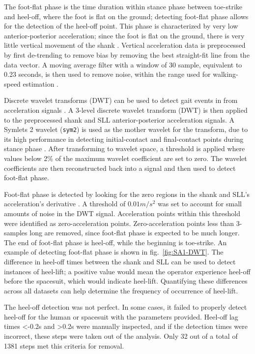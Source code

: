 \documentclass[defaultstyle,11pt]{comps}
\begin{document}
The foot-flat phase is the time duration within stance phase between toe-strike and heel-off, where the foot is flat on the ground; detecting foot-flat phase allows for the detection of the heel-off point.
This phase is characterized by very low anterior-posterior acceleration; since the foot is flat on the ground, there is very little vertical movement of the shank \citep{Rebula2013}.
Vertical acceleration data is preprocessed by first de-trending to remove bias by removing the best straight-fit line from the data vector.
A moving average filter with a window of 30 sample, equivalent to 0.23 seconds, is then used to remove noise, within the range used for walking-speed estimation \citep{Byun2019}.

Discrete wavelet transforms (DWT) can be used to detect gait events in from acceleration signals \citep{Ji2019}.
A 3-level discrete wavelet transform (DWT) is then applied to the preprocessed shank and SLL anterior-posterior acceleration signals.
A Symlets 2 wavelet (\texttt{sym2}) is used as the mother wavelet for the transform, due to its high performance in detecting initial-contact and final-contact points during stance phase \citep{Ji2019}.
After transforming to wavelet space, a threshold is applied where values below 2\% of the maximum wavelet coefficient are set to zero.
The wavelet coefficients are then reconstructed back into a signal and then used to detect foot-flat phase.

Foot-flat phase is detected by looking for the zero regions in the shank and SLL's acceleration's derivative \citep{Mariani2013}.
A threshold of \(0.01 m/s^{2}\) was set to account for small amounts of noise in the DWT signal.
Acceleration points within this threshold were identified as zero-acceleration points.
Zero-acceleration points less than 3-samples long are removed, since foot-flat phase is expected to be much longer.
The end of foot-flat phase is heel-off, while the beginning is toe-strike.
An example of detecting foot-flat phase is shown in fig.~\ref{fig:SA1-DWT}.
The difference in heel-off times between the shank and SLL can be used to detect instances of heel-lift; a positive value would mean the operator experience heel-off before the spacesuit, which would indicate heel-lift.
Quantifying these differences across all datasets can help determine the frequency of occurrence of heel-lift.

The heel-off detection was not perfect.
In some cases, it failed to properly detect heel-off for the human or spacesuit with the parameters provided.
Heel-off lag times \textless-0.2s and \textgreater0.2s were manually inspected, and if the detection times were incorrect, these steps were taken out of the analysis.
Only 32 out of a total of 1381 steps met this criteria for removal.
\end{document}
